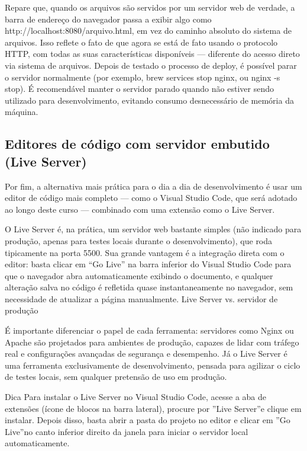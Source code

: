 Repare que, quando os arquivos são servidos por um servidor web de verdade, a barra de endereço do navegador passa a exibir algo como http://localhost:8080/arquivo.html, em vez do caminho absoluto do sistema de arquivos. Isso reflete o fato de que agora se está de fato usando o protocolo HTTP, com todas as suas características disponíveis — diferente do acesso direto via sistema de arquivos. Depois de testado o processo de deploy, é possível parar o servidor normalmente (por exemplo, brew services stop nginx, ou nginx -s stop). É recomendável manter o servidor parado quando não estiver sendo utilizado para desenvolvimento, evitando consumo desnecessário de memória da máquina.

\subsection{Editores de código com servidor embutido (Live Server)}

Por fim, a alternativa mais prática para o dia a dia de desenvolvimento é usar um editor de código mais completo — como o Visual Studio Code, que será adotado ao longo deste curso — combinado com uma extensão como o Live Server.

O Live Server é, na prática, um servidor web bastante simples (não indicado para produção, apenas para testes locais durante o desenvolvimento), que roda tipicamente na porta 5500. Sua grande vantagem é a integração direta com o editor: basta clicar em “Go Live” na barra inferior do Visual Studio Code para que o navegador abra automaticamente exibindo o documento, e qualquer alteração salva no código é refletida quase instantaneamente no navegador, sem necessidade de atualizar a página manualmente. Live Server vs. servidor de produção

É importante diferenciar o papel de cada ferramenta: servidores como Nginx ou Apache são projetados para ambientes de produção, capazes de lidar com tráfego real e configurações avançadas de segurança e desempenho. Já o Live Server é uma ferramenta exclusivamente de desenvolvimento, pensada para agilizar o ciclo de testes locais, sem qualquer pretensão de uso em produção.

\begin{infobox}{Dica}
Para instalar o Live Server no Visual Studio Code, acesse a aba de extensões (ícone de blocos na barra lateral), procure por ”Live Server”e clique em instalar. Depois disso, basta abrir a pasta do projeto no editor e clicar em ”Go Live”no canto inferior direito da janela para iniciar o servidor local automaticamente.
\end{infobox}

